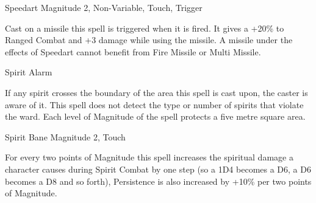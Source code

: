 \begin{rpg-spell}
{Speedart}
{Magnitude 2, Non-Variable, Touch, Trigger}

Cast on a missile this spell is triggered when it is fired. It gives a +20\% to Ranged Combat and +3 damage while using the missile. A missile under the effects of Speedart cannot benefit from Fire Missile or Multi Missile.
\end{rpg-spell}


\begin{rpg-spell}
{Spirit Alarm}
{}

If any spirit crosses the boundary of the area this spell is cast upon, the caster is aware of it. This spell does not detect the type or number of spirits that violate the ward. Each level of Magnitude of the spell protects a five metre square area.
\end{rpg-spell}


\begin{rpg-spell}
{Spirit Bane}
{Magnitude 2, Touch}

For every two points of Magnitude this spell increases the spiritual damage a character causes during Spirit Combat by one step (so a 1D4 becomes a D6, a D6 becomes a D8 and so forth), Persistence is also increased by +10\% per two points of Magnitude.
\end{rpg-spell}


